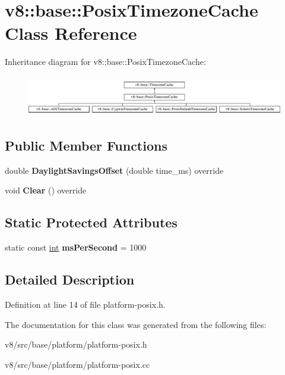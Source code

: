\hypertarget{classv8_1_1base_1_1PosixTimezoneCache}{}\section{v8\+:\+:base\+:\+:Posix\+Timezone\+Cache Class Reference}
\label{classv8_1_1base_1_1PosixTimezoneCache}
Inheritance diagram for v8\+:\+:base\+:\+:Posix\+Timezone\+Cache\+:\begin{figure}[H]
\begin{center}
\leavevmode
\includegraphics[height=1.802575cm]{classv8_1_1base_1_1PosixTimezoneCache}
\end{center}
\end{figure}
\subsection*{Public Member Functions}
\begin{DoxyCompactItemize}
\item 
\mbox{\label{classv8_1_1base_1_1PosixTimezoneCache_a94bb37e85ac12ec55c822caff7d190c5}} 
double {\bfseries Daylight\+Savings\+Offset} (double time\+\_\+ms) override
\item 
\mbox{\label{classv8_1_1base_1_1PosixTimezoneCache_a80a4757305708aed794f1316f48f559f}} 
void {\bfseries Clear} () override
\end{DoxyCompactItemize}
\subsection*{Static Protected Attributes}
\begin{DoxyCompactItemize}
\item 
\mbox{\label{classv8_1_1base_1_1PosixTimezoneCache_aec984ac734484b7002e060761844519d}} 
static const \mbox{\hyperlink{classint}{int}} {\bfseries ms\+Per\+Second} = 1000
\end{DoxyCompactItemize}


\subsection{Detailed Description}


Definition at line 14 of file platform-\/posix.\+h.



The documentation for this class was generated from the following files\+:\begin{DoxyCompactItemize}
\item 
v8/src/base/platform/platform-\/posix.\+h\item 
v8/src/base/platform/platform-\/posix.\+cc\end{DoxyCompactItemize}
